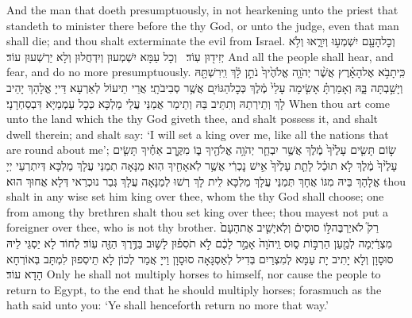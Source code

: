 {And the man that doeth presumptuously, in not hearkening unto the priest that standeth to minister there before the \lord\space thy God, or unto the judge, even that man shall die; and thou shalt exterminate the evil from Israel.}{}
{וְכׇל\maqqaf הָעָ֖ם יִשְׁמְע֣וּ וְיִרָ֑אוּ וְלֹ֥א יְזִיד֖וּן עֽוֹד׃ \setuma }
{וְכָל עַמָּא יִשְׁמְעוּן וְיִדְחֲלוּן וְלָא יַרְשְׁעוּן עוֹד׃}
{And all the people shall hear, and fear, and do no more presumptuously.}{}
\newseder
{}%
{כִּֽי\maqqaf תָבֹ֣א אֶל\maqqaf הָאָ֗רֶץ אֲשֶׁ֨ר יְהֹוָ֤ה אֱלֹהֶ֙יךָ֙ נֹתֵ֣ן לָ֔ךְ וִֽירִשְׁתָּ֖הּ וְיָשַׁ֣בְתָּה בָּ֑הּ וְאָמַרְתָּ֗ אָשִׂ֤ימָה עָלַי֙ מֶ֔לֶךְ כְּכׇל\maqqaf הַגּוֹיִ֖ם אֲשֶׁ֥ר סְבִיבֹתָֽי׃}
{אֲרֵי תֵיעוֹל לְאַרְעָא דַּייָ אֱלָהָךְ יָהֵיב לָךְ וְתֵירְתַהּ וְתִתֵּיב בַּהּ וְתֵימַר אֲמַנֵּי עֲלַי מַלְכָּא כְּכָל עַמְמַיָּא דִּבְסַחְרָנָי׃}
{When thou art come unto the land which the \lord\space thy God giveth thee, and shalt possess it, and shalt dwell therein; and shalt say: ‘I will set a king over me, like all the nations that are round about me’;}{}
{שׂ֣וֹם תָּשִׂ֤ים עָלֶ֙יךָ֙ מֶ֔לֶךְ אֲשֶׁ֥ר יִבְחַ֛ר יְהֹוָ֥ה אֱלֹהֶ֖יךָ בּ֑וֹ מִקֶּ֣רֶב אַחֶ֗יךָ תָּשִׂ֤ים עָלֶ֙יךָ֙ מֶ֔לֶךְ לֹ֣א תוּכַ֗ל לָתֵ֤ת עָלֶ֙יךָ֙ אִ֣ישׁ נׇכְרִ֔י אֲשֶׁ֥ר לֹֽא\maqqaf אָחִ֖יךָ הֽוּא׃}
{מַנָּאָה תְמַנֵּי עֲלָךְ מַלְכָּא דְּיִתְרְעֵי יְיָ אֱלָהָךְ בֵּיהּ מִגּוֹ אֲחָךְ תְּמַנֵּי עֲלָךְ מַלְכָּא לֵית לָךְ רְשׁוּ לְמַנָּאָה עֲלָךְ גְּבַר נוּכְרַאי דְּלָא אֲחוּךְ הוּא׃}
{thou shalt in any wise set him king over thee, whom the \lord\space thy God shall choose; one from among thy brethren shalt thou set king over thee; thou mayest not put a foreigner over thee, who is not thy brother.}{}
{רַק֮ לֹא\maqqaf יַרְבֶּה\maqqaf לּ֣וֹ סוּסִים֒ וְלֹֽא\maqqaf יָשִׁ֤יב אֶת\maqqaf הָעָם֙ מִצְרַ֔יְמָה לְמַ֖עַן הַרְבּ֣וֹת ס֑וּס וַֽיהֹוָה֙ אָמַ֣ר לָכֶ֔ם לֹ֣א תֹסִפ֗וּן לָשׁ֛וּב בַּדֶּ֥רֶךְ הַזֶּ֖ה עֽוֹד׃}
{לְחוֹד לָא יַסְגֵּי לֵיהּ סוּסָוָן וְלָא יָתִיב יָת עַמָּא לְמִצְרַיִם בְּדִיל לְאַסְגָּאָה סוּסָוָן וַייָ אֲמַר לְכוֹן לָא תֵיסְפוּן לִמְתָּב בְּאוֹרְחָא הָדָא עוֹד׃}
{Only he shall not multiply horses to himself, nor cause the people to return to Egypt, to the end that he should multiply horses; forasmuch as the \lord\space hath said unto you: ‘Ye shall henceforth return no more that way.’}{}
